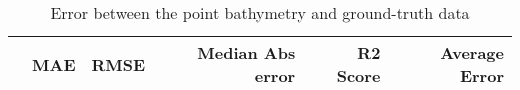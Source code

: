 \begin{table}[h!]
\caption{Error between the point bathymetry and ground-truth data}
\label{tab:charlotteamalie_lidar_error}
\begin{tabular}{lrrrrr}
\toprule
 & MAE & RMSE & Median Abs error & R2 Score & Average Error \\
\midrule
\bottomrule
\end{tabular}
\end{table}
